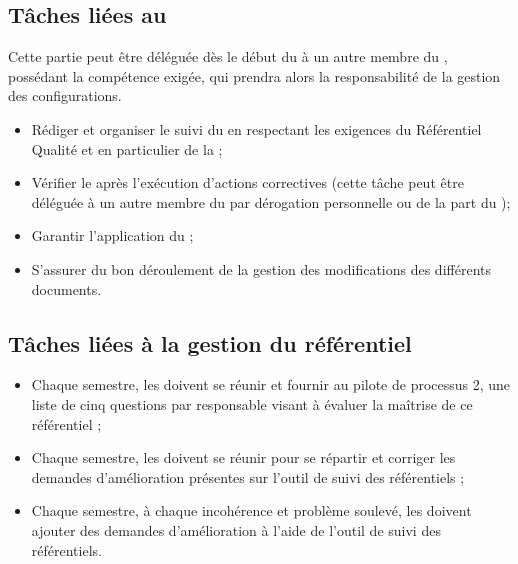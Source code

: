 \documentclass[11pt]{article}
\begin{document}
\subsection*{Tâches liées au \PGCCourt}

Cette partie peut être déléguée dès le début du \PICCourt{} à un autre membre du \PICCourt{}, possédant la compétence exigée, qui prendra alors la responsabilité de la gestion des configurations.

\begin{itemize}
	\item Rédiger et organiser le suivi du \PGCCourt{} en respectant les exigences du Référentiel Qualité et en particulier de la \DGQDEUXCourt;


	\item Vérifier le \PGCCourt{} après l’exécution d’actions correctives (cette tâche peut être déléguée à un autre membre du \PICCourt{} par dérogation personnelle ou de la part du \CP);

	\item Garantir l’application du \PGCCourt;
	\item S’assurer du bon déroulement de la gestion des modifications des différents documents.
\end{itemize}

\subsection*{Tâches liées à la gestion du référentiel}

\begin{itemize}

	\item Chaque semestre, les \RQs{} doivent se réunir et fournir au pilote de processus 2, une liste de cinq questions par responsable visant à évaluer la maîtrise de ce référentiel ;

	\item Chaque semestre, les \RQs{} doivent se réunir pour se répartir et corriger les demandes d’amélioration présentes sur l’outil de suivi des référentiels ;
	\item Chaque semestre, à chaque incohérence et problème soulevé, les \RQs{} doivent ajouter des demandes d’amélioration à l’aide de l’outil de suivi des référentiels.
\end{itemize}
\end{document}

